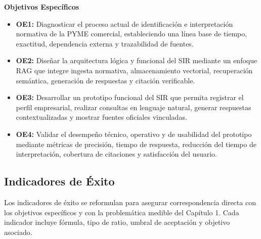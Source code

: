 \documentclass[12pt,a4paper,oneside]{report}
\begin{document}
\textbf{Objetivos Específicos}

\begin{itemize}
\item \textbf{OE1:} Diagnosticar el proceso actual de identificación e interpretación normativa de la PYME comercial, estableciendo una línea base de tiempo, exactitud, dependencia externa y trazabilidad de fuentes.
\item \textbf{OE2:} Diseñar la arquitectura lógica y funcional del SIR mediante un enfoque RAG que integre ingesta normativa, almacenamiento vectorial, recuperación semántica, generación de respuestas y citación verificable.
\item \textbf{OE3:} Desarrollar un prototipo funcional del SIR que permita registrar el perfil empresarial, realizar consultas en lenguaje natural, generar respuestas contextualizadas y mostrar fuentes oficiales vinculadas.
\item \textbf{OE4:} Validar el desempeño técnico, operativo y de usabilidad del prototipo mediante métricas de precisión, tiempo de respuesta, reducción del tiempo de interpretación, cobertura de citaciones y satisfacción del usuario.
\end{itemize}

\subsection{Indicadores de Éxito}\label{subsec:indicadores-de-exito}

Los indicadores de éxito se reformulan para asegurar correspondencia directa con los objetivos específicos y con la problemática medible del Capítulo 1. Cada indicador incluye fórmula, tipo de ratio, umbral de aceptación y objetivo asociado.
\end{document}
